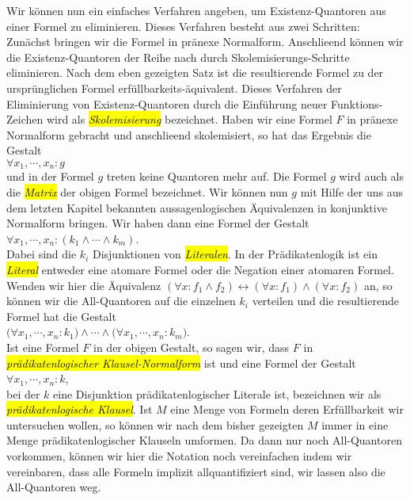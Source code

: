 Wir k\"{o}nnen nun ein einfaches Verfahren angeben, um Existenz-Quantoren aus einer Formel
zu eliminieren.  Dieses Verfahren besteht aus zwei Schritten:  Zun\"{a}chst bringen wir die Formel
in pr\"{a}nexe Normalform. Anschlie\3end k\"{o}nnen wir die Existenz-Quantoren der Reihe nach durch 
Skolemisierungs-Schritte eliminieren.  Nach dem eben gezeigten Satz ist die resultierende 
Formel zu der urspr\"{u}nglichen Formel erf\"{u}llbarkeits-\"{a}quivalent.  Dieses
Verfahren der Eliminierung von Existenz-Quantoren durch die Einf\"{u}hrung neuer
Funktions-Zeichen wird als \colorbox{yellow}{\emph{Skolemisierung}} bezeichnet.  Haben wir eine Formel $F$
in pr\"{a}nexe Normalform gebracht und anschlie\3end skolemisiert, so hat das Ergebnis die Gestalt\\[0.2cm]
\hspace*{1.3cm} $\forall x_1, \cdots, x_n: g$ \\[0.2cm]
und in der Formel $g$ treten keine Quantoren mehr auf.  Die Formel $g$ wird auch als die
\colorbox{yellow}{\emph{Matrix}} der obigen Formel bezeichnet.  Wir k\"{o}nnen nun  $g$ mit Hilfe
der uns aus dem letzten Kapitel bekannten aussagenlogischen
 \"{A}quivalenzen in konjunktive Normalform bringen.  Wir haben dann eine
Formel der Gestalt \\[0.2cm]
\hspace*{1.3cm} $\forall x_1, \cdots, x_n: (k_1 \wedge \cdots \wedge k_m)$. \\[0.2cm]
Dabei sind die $k_i$ Disjunktionen von \colorbox{yellow}{\emph{Literalen}}.  In der Pr\"{a}dikatenlogik ist ein
\colorbox{yellow}{\emph{Literal}} entweder eine atomare Formel oder die Negation einer atomaren Formel.  Wenden wir
hier  die \"{A}quivalenz 
$(\forall x\colon f_1\wedge f_2) \leftrightarrow (\forall x\colon f_1) \wedge (\forall x\colon f_2)$
an, so k\"{o}nnen wir die All-Quantoren auf die einzelnen $k_i$ verteilen und
die resultierende Formel hat die Gestalt \\[0.2cm]
\hspace*{1.3cm} 
$\big(\forall x_1, \cdots, x_n: k_1\big) \wedge \cdots \wedge \big(\forall x_1, \cdots, x_n: k_m\big)$. \\[0.2cm]
Ist eine Formel $F$ in der obigen
Gestalt, so sagen wir, dass $F$ in \colorbox{yellow}{\emph{pr\"{a}dikatenlogischer Klausel-Normalform}} ist und eine
Formel der Gestalt \\[0.2cm]
\hspace*{1.3cm} $\forall x_1, \cdots, x_n: k$, \\[0.2cm]
bei der $k$ eine Disjunktion pr\"{a}dikatenlogischer Literale ist,
bezeichnen wir als \colorbox{yellow}{\emph{pr\"{a}dikatenlogische Klausel}}.  Ist $M$
eine Menge von Formeln deren Erf\"{u}llbarkeit wir untersuchen wollen, so k\"{o}nnen wir nach dem
bisher gezeigten $M$ immer in eine Menge pr\"{a}dikatenlogischer Klauseln umformen.
Da  dann nur noch All-Quantoren vorkommen, k\"{o}nnen wir hier die  Notation noch vereinfachen
indem wir vereinbaren, dass alle Formeln implizit allquantifiziert sind, wir lassen also
die All-Quantoren weg.

